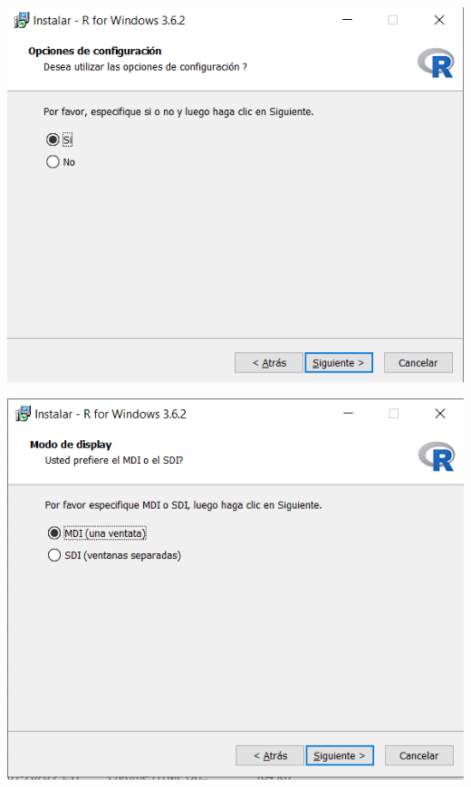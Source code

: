 \documentclass[
]{article}
\begin{document}
\begin{center}\includegraphics[width=8.06in]{./figs/Instalacion R- Win (4)} \end{center}

\begin{center}\includegraphics[width=8.07in]{./figs/Instalacion R- Win (5)} \end{center}
\end{document}
